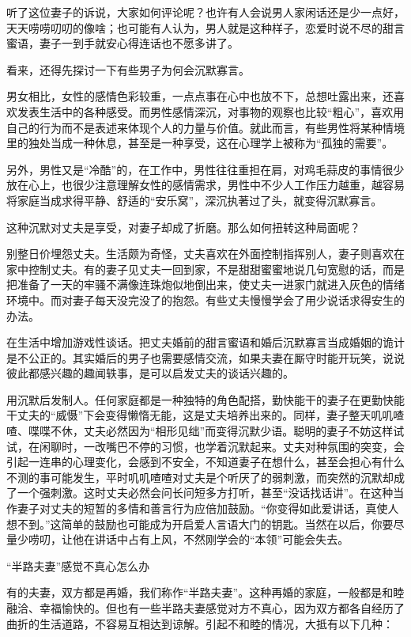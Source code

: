 \documentclass[12pt,UTF8]{ctexbook}
\begin{document}
听了这位妻子的诉说，大家如何评论呢？也许有人会说男人家闲话还是少一点好，天天唠唠叨叨的像啥；也可能有人认为，男人就是这种样子，恋爱时说不尽的甜言蜜语，妻子一到手就安心得连话也不愿多讲了。

看来，还得先探讨一下有些男子为何会沉默寡言。

男女相比，女性的感情色彩较重，一点点事在心中也放不下，总想吐露出来，还喜欢发表生活中的各种感受。而男性感情深沉，对事物的观察也比较“粗心”，喜欢用自己的行为而不是表述来体现个人的力量与价值。就此而言，有些男性将某种情境里的独处当成一种休息，甚至是一种享受，这在心理学上被称为“孤独的需要”。

另外，男性又是“冷酷”的，在工作中，男性往往重担在肩，对鸡毛蒜皮的事情很少放在心上，也很少注意理解女性的感情需求，男性中不少人工作压力越重，越容易将家庭当成求得平静、舒适的“安乐窝”，深沉执著过了头，就变得沉默寡言。

这种沉默对丈夫是享受，对妻子却成了折磨。那么如何扭转这种局面呢？

别整日价埋怨丈夫。生活颇为奇怪，丈夫喜欢在外面控制指挥别人，妻子则喜欢在家中控制丈夫。有的妻子见丈夫一回到家，不是甜甜蜜蜜地说几句宽慰的话，而是把准备了一天的牢骚不满像连珠炮似地倒出来，使丈夫一进家门就进入灰色的情绪环境中。而对妻子每天没完没了的抱怨。有些丈夫慢慢学会了用少说话求得安生的办法。

在生活中增加游戏性谈话。把丈夫婚前的甜言蜜语和婚后沉默寡言当成婚姻的诡计是不公正的。其实婚后的男子也需要感情交流，如果夫妻在厮守时能开玩笑，说说彼此都感兴趣的趣闻轶事，是可以启发丈夫的谈话兴趣的。

用沉默后发制人。任何家庭都是一种独特的角色配搭，勤快能干的妻子在更勤快能干丈夫的“威慑”下会变得懒惰无能，这是丈夫培养出来的。同样，妻子整天叽叽喳喳、喋喋不休，丈夫必然因为“相形见绌”而变得沉默少语。聪明的妻子不妨这样试试，在闲聊时，一改嘴巴不停的习惯，也学着沉默起来。丈夫对种氛围的突变，会引起一连串的心理变化，会感到不安全，不知道妻子在想什么，甚至会担心有什么不测的事可能发生，平时叽叽喳喳对丈夫是个听厌了的弱刺激，而突然的沉默却成了一个强刺激。这时丈夫必然会问长问短多方打听，甚至“没话找话讲”。在这种当作妻子对丈夫的短暂的多情和善言行为应倍加鼓励。“你变得如此爱讲话，真使人想不到。”这简单的鼓励也可能成为开启爱人言语大门的钥匙。当然在以后，你要尽量少唠叨，让他在讲话中占有上风，不然刚学会的“本领”可能会失去。





“半路夫妻”感觉不真心怎么办


有的夫妻，双方都是再婚，我们称作“半路夫妻”。这种再婚的家庭，一般都是和睦融洽、幸福愉快的。但也有一些半路夫妻感觉对方不真心，因为双方都各自经历了曲折的生活道路，不容易互相达到谅解。引起不和睦的情况，大抵有以下几种：
\end{document}
